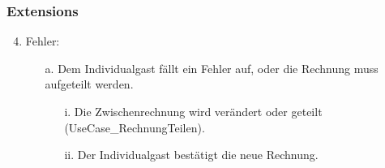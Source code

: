 \documentclass[./detailed_overview_usecases.tex]{subfiles}
\begin{document}
    \subsubsection*{Extensions}
    \begin{enumerate}
        \setcounter{enumi}{3}
        \item Fehler:
        \begin{itemize}
            \item[a.] Dem Individualgast fällt ein Fehler auf, oder die Rechnung muss aufgeteilt werden.
            \begin{itemize}
                \item[i.] Die Zwischenrechnung wird verändert oder geteilt (UseCase_RechnungTeilen).
                \item[ii.] Der Individualgast bestätigt die neue Rechnung.
            \end{itemize}
        \end{itemize}
    \end{enumerate}
\end{document}
